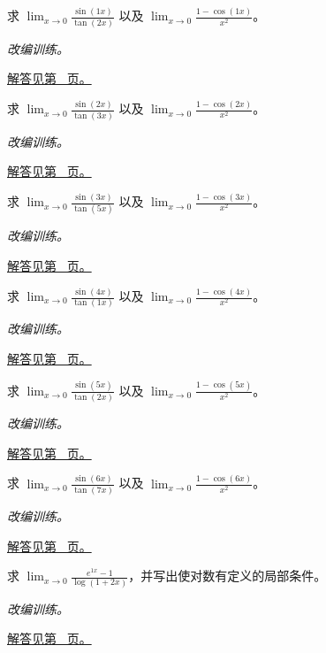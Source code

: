 \documentclass[UTF8,12pt,a4paper,fontset=fandol]{ctexart}
\begin{document}
\begin{example}[三角函数的局部比较]\label{ex:c3q8}
求 $\displaystyle\lim_{x\to0}\frac{\sin(1x)}{\tan(2x)}$ 以及 $\displaystyle\lim_{x\to0}\frac{1-\cos(1x)}{x^2}$。
\par\textit{改编训练。}\par\hyperref[ans:c3q8]{解答见第~\pageref{ans:c3q8} 页。}
\end{example}
\begin{example}[三角函数的局部比较]\label{ex:c3q9}
求 $\displaystyle\lim_{x\to0}\frac{\sin(2x)}{\tan(3x)}$ 以及 $\displaystyle\lim_{x\to0}\frac{1-\cos(2x)}{x^2}$。
\par\textit{改编训练。}\par\hyperref[ans:c3q9]{解答见第~\pageref{ans:c3q9} 页。}
\end{example}
\begin{example}[三角函数的局部比较]\label{ex:c3q10}
求 $\displaystyle\lim_{x\to0}\frac{\sin(3x)}{\tan(5x)}$ 以及 $\displaystyle\lim_{x\to0}\frac{1-\cos(3x)}{x^2}$。
\par\textit{改编训练。}\par\hyperref[ans:c3q10]{解答见第~\pageref{ans:c3q10} 页。}
\end{example}
\begin{example}[三角函数的局部比较]\label{ex:c3q11}
求 $\displaystyle\lim_{x\to0}\frac{\sin(4x)}{\tan(1x)}$ 以及 $\displaystyle\lim_{x\to0}\frac{1-\cos(4x)}{x^2}$。
\par\textit{改编训练。}\par\hyperref[ans:c3q11]{解答见第~\pageref{ans:c3q11} 页。}
\end{example}
\begin{example}[三角函数的局部比较]\label{ex:c3q12}
求 $\displaystyle\lim_{x\to0}\frac{\sin(5x)}{\tan(2x)}$ 以及 $\displaystyle\lim_{x\to0}\frac{1-\cos(5x)}{x^2}$。
\par\textit{改编训练。}\par\hyperref[ans:c3q12]{解答见第~\pageref{ans:c3q12} 页。}
\end{example}
\begin{example}[三角函数的局部比较]\label{ex:c3q13}
求 $\displaystyle\lim_{x\to0}\frac{\sin(6x)}{\tan(7x)}$ 以及 $\displaystyle\lim_{x\to0}\frac{1-\cos(6x)}{x^2}$。
\par\textit{改编训练。}\par\hyperref[ans:c3q13]{解答见第~\pageref{ans:c3q13} 页。}
\end{example}
\begin{example}[对数与指数复合的极限]\label{ex:c3q14}
求 $\displaystyle\lim_{x\to0}\frac{e^{1x}-1}{\log(1+2x)}$，并写出使对数有定义的局部条件。
\par\textit{改编训练。}\par\hyperref[ans:c3q14]{解答见第~\pageref{ans:c3q14} 页。}
\end{example}
\end{document}

